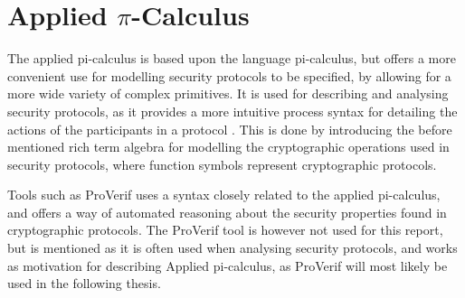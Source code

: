 \section{Applied $\pi$-Calculus}

The applied pi-calculus is based upon the language pi-calculus, but offers a more convenient use for modelling security protocols to be specified, by allowing for a more wide variety of complex primitives. It is used for describing and analysing security protocols, as it provides a more intuitive process syntax for detailing the actions of the participants in a protocol \autocite{AplliedPiCalsulus2010}. This is done by introducing the before mentioned rich term algebra for modelling the cryptographic operations used in security protocols, where function symbols represent cryptographic protocols. 

Tools such as ProVerif \autocite{ProVerif} uses a syntax closely related to the applied pi-calculus, and offers a way of automated reasoning about the security properties found in cryptographic protocols. The ProVerif tool is however not used for this report, but is mentioned as it is often used when analysing security protocols, and works as motivation for describing Applied pi-calculus, as ProVerif will most likely be used in the following thesis.\\
